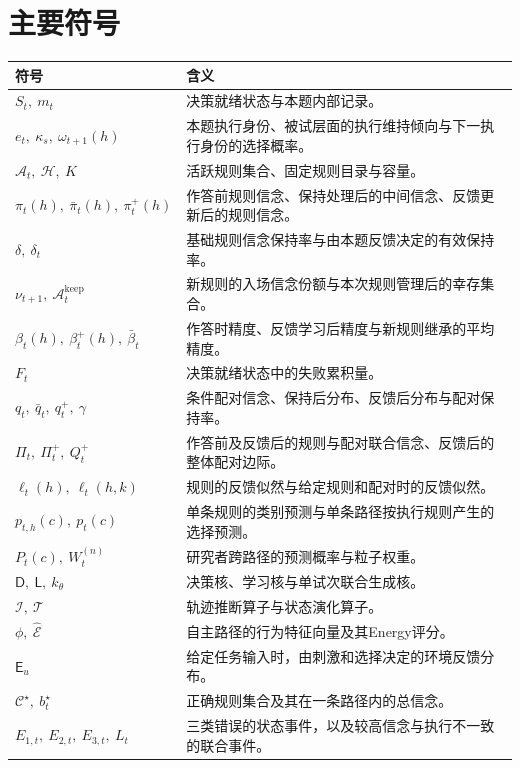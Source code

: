 \documentclass[11pt,a4paper]{article}
\numberwithin{equation}{section}
\newcommand{\A}{\mathcal{A}}
\newcommand{\Hh}{\mathcal{H}}
\newcommand{\Dd}{\mathsf{D}}
\newcommand{\Ll}{\mathsf{L}}
\newcommand{\Ee}{\mathsf{E}}
\newcommand{\Ii}{\mathcal{I}}
\newcommand{\Tt}{\mathcal{T}}
\begin{document}
\clearpage
\section{主要符号}
\label{app:symbols}

{\small
\begin{longtable}{L{3.0cm}L{11.5cm}}
\toprule
符号 & 含义\\
\midrule\endhead
$S_t,\ m_t$ & 决策就绪状态与本题内部记录。\\
$e_t,\ \kappa_s,\ \omega_{t+1}(h)$ & 本题执行身份、被试层面的执行维持倾向与下一执行身份的选择概率。\\
$\A_t,\ \Hh,\ K$ & 活跃规则集合、固定规则目录与容量。\\

$\pi_t(h),\ \bar\pi_t(h),\ \pi_t^+(h)$ & 作答前规则信念、保持处理后的中间信念、反馈更新后的规则信念。\\
$\delta,\ \delta_t$ & 基础规则信念保持率与由本题反馈决定的有效保持率。\\
$\nu_{t+1},\ \A_t^{\mathrm{keep}}$ & 新规则的入场信念份额与本次规则管理后的幸存集合。\\
$\beta_t(h),\ \beta_t^+(h),\ \bar\beta_t$ & 作答时精度、反馈学习后精度与新规则继承的平均精度。\\
$F_t$ & 决策就绪状态中的失败累积量。\\
$q_t,\ \bar q_t,\ q_t^+,\ \gamma$ & 条件配对信念、保持后分布、反馈后分布与配对保持率。\\
$\Pi_t,\ \Pi_t^+,\ Q_t^+$ & 作答前及反馈后的规则与配对联合信念、反馈后的整体配对边际。\\
$\ell_t(h),\ \ell_t(h,k)$ & 规则的反馈似然与给定规则和配对时的反馈似然。\\
$p_{t,h}(c),\ p_t(c)$ & 单条规则的类别预测与单条路径按执行规则产生的选择预测。\\
$P_t(c),\ W_t^{(n)}$ & 研究者跨路径的预测概率与粒子权重。\\
$\Dd,\ \Ll,\ k_\theta$ & 决策核、学习核与单试次联合生成核。\\
$\Ii,\ \Tt$ & 轨迹推断算子与状态演化算子。\\
$\phi,\ \widehat{\mathcal E}$ & 自主路径的行为特征向量及其Energy评分。\\
$\Ee_u$ & 给定任务输入时，由刺激和选择决定的环境反馈分布。\\
$\mathcal C^\star,\ b_t^\star$ & 正确规则集合及其在一条路径内的总信念。\\
$E_{1,t},\ E_{2,t},\ E_{3,t},\ L_t$ & 三类错误的状态事件，以及较高信念与执行不一致的联合事件。\\

\bottomrule
\end{longtable}}
\end{document}
